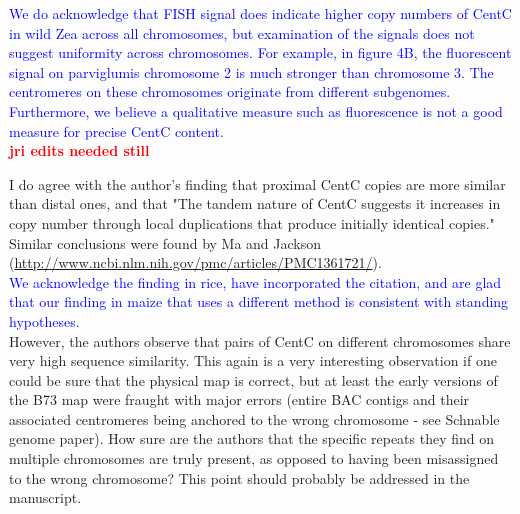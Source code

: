 \documentclass[]{article}
\newcommand{\res}[1]{\noindent \textcolor{blue}{{#1}} \\}
\newcommand{\jri}[1]{\textcolor{red}{{\bf #1}} }
\begin{document}
\res{We do acknowledge that FISH signal does indicate higher copy numbers of CentC in wild Zea across all chromosomes, but examination of the signals does not suggest uniformity across chromosomes.  
For example, in figure 4B, the fluorescent signal on parviglumis chromosome 2 is much stronger than chromosome 3.  
The centromeres on these chromosomes originate from different subgenomes.  
Furthermore, we believe a qualitative measure such as fluorescence is not a good measure for precise CentC content.} \jri{jri edits needed still}

I do agree with the author's finding that proximal CentC copies are more similar than distal ones, and that "The tandem nature of CentC suggests it increases in copy number through local duplications that produce initially identical copies." Similar conclusions were found by Ma and Jackson (\url{http://www.ncbi.nlm.nih.gov/pmc/articles/PMC1361721/}).\\

\res{We acknowledge the finding in rice, have incorporated the citation, and are glad that our finding in maize that uses a different method is consistent with standing hypotheses.}

However, the authors observe that pairs of  CentC on different chromosomes share very high sequence similarity.  This again is a very interesting observation if one could be sure that the physical map is correct, but at least the early versions of the B73 map were fraught with major errors (entire BAC contigs and their associated centromeres being anchored to the wrong chromosome - see Schnable genome paper).  How sure are the authors that the specific repeats they find on multiple chromosomes are truly present, as opposed to having been misassigned to the wrong chromosome? This point should probably be addressed in the manuscript.\\
\end{document}
